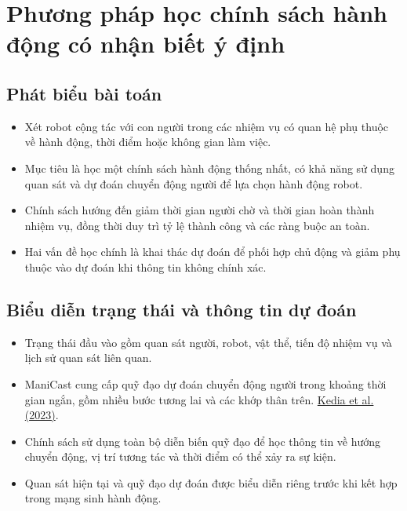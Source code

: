 \chapter[Phương pháp học chính sách hành động có nhận biết ý định]{Phương pháp học chính sách hành động có nhận biết ý định}
\label{chap:method}




\section{Phát biểu bài toán}

\begin{itemize}
    \item Xét robot cộng tác với con người trong các nhiệm vụ có quan hệ phụ thuộc về hành động, thời điểm hoặc không gian làm việc.

    \item Mục tiêu là học một chính sách hành động thống nhất, có khả năng sử dụng quan sát và dự đoán chuyển động người để lựa chọn hành động robot.

    \item Chính sách hướng đến giảm thời gian người chờ và thời gian hoàn thành nhiệm vụ, đồng thời duy trì tỷ lệ thành công và các ràng buộc an toàn.

    \item Hai vấn đề học chính là khai thác dự đoán để phối hợp chủ động và giảm phụ thuộc vào dự đoán khi thông tin không chính xác.
\end{itemize}


\section{Biểu diễn trạng thái và thông tin dự đoán}

\begin{itemize}
    \item Trạng thái đầu vào gồm quan sát người, robot, vật thể, tiến độ nhiệm vụ và lịch sử quan sát liên quan.

    \item ManiCast cung cấp quỹ đạo dự đoán chuyển động người trong khoảng thời gian ngắn, gồm nhiều bước tương lai và các khớp thân trên.
    \href{https://proceedings.mlr.press/v229/kedia23a.html}{Kedia et al. (2023)}.

    \item Chính sách sử dụng toàn bộ diễn biến quỹ đạo để học thông tin về hướng chuyển động, vị trí tương tác và thời điểm có thể xảy ra sự kiện.

    \item Quan sát hiện tại và quỹ đạo dự đoán được biểu diễn riêng trước khi kết hợp trong mạng sinh hành động.
\end{itemize}


